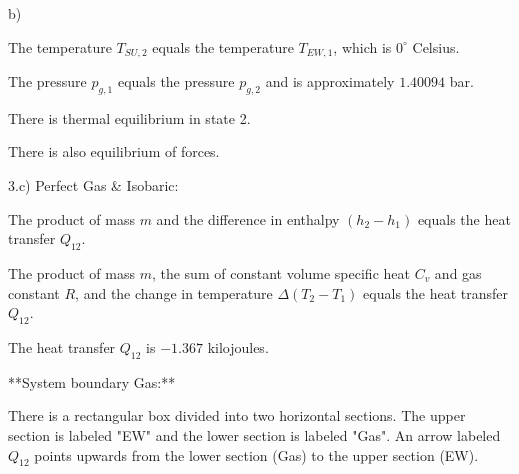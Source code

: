b)

The temperature \( T_{SU,2} \) equals the temperature \( T_{EW,1} \), which is \( 0^\circ \) Celsius.

The pressure \( p_{g,1} \) equals the pressure \( p_{g,2} \) and is approximately \( 1.40094 \) bar.

There is thermal equilibrium in state 2.

There is also equilibrium of forces.

3.c) Perfect Gas & Isobaric:

The product of mass \( m \) and the difference in enthalpy \( (h_2 - h_1) \) equals the heat transfer \( Q_{12} \).

The product of mass \( m \), the sum of constant volume specific heat \( C_v \) and gas constant \( R \), and the change in temperature \( \Delta (T_2 - T_1) \) equals the heat transfer \( Q_{12} \).

The heat transfer \( Q_{12} \) is \(-1.367 \) kilojoules.

**System boundary Gas:**

There is a rectangular box divided into two horizontal sections. The upper section is labeled "EW" and the lower section is labeled "Gas". An arrow labeled \( Q_{12} \) points upwards from the lower section (Gas) to the upper section (EW).